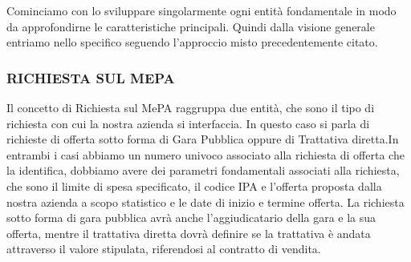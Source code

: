 Cominciamo con lo sviluppare singolarmente ogni entità fondamentale in modo da approfondirne le caratteristiche principali. Quindi dalla visione generale entriamo nello specifico seguendo l'approccio misto precedentemente citato.\newline

\subsubsection{RICHIESTA SUL MEPA}
Il concetto di Richiesta sul MePA raggruppa due entità, che sono il tipo di richiesta con cui la nostra azienda si interfaccia. In questo caso si parla di richieste di offerta sotto forma di Gara Pubblica oppure di Trattativa diretta.\newline In entrambi i casi abbiamo un numero univoco associato alla richiesta di offerta che la identifica, dobbiamo avere dei parametri fondamentali associati alla richiesta, che sono il limite di spesa specificato, il codice IPA e l'offerta proposta dalla nostra azienda a scopo statistico e le date di inizio e termine offerta.\newline
La richiesta sotto forma di gara pubblica avrà anche l'aggiudicatario della gara e la sua offerta, mentre il trattativa diretta dovrà definire se la trattativa è andata attraverso il valore stipulata, riferendosi al contratto di vendita.\newline\newline
\noindent{}

